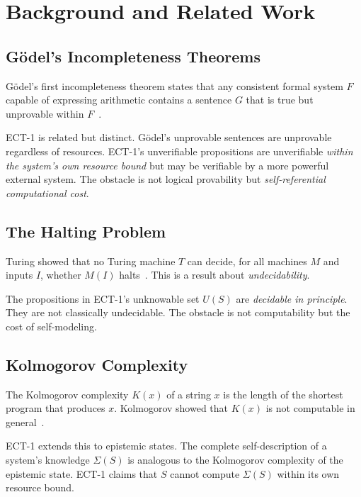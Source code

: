 \documentclass[12pt]{article}
\theoremstyle{definition}
\newcommand{\SM}{\Sigma(S)}
\newcommand{\US}{U(S)}
\begin{document}
\section{Background and Related Work}
\label{sec:background}

\subsection{G\"{o}del's Incompleteness Theorems}

G\"{o}del's first incompleteness theorem states that any consistent formal system $F$ capable of expressing arithmetic contains a sentence $G$ that is true but unprovable within $F$~\cite{godel1931}.

ECT-1 is related but distinct. G\"{o}del's unprovable sentences are unprovable regardless of resources. ECT-1's unverifiable propositions are unverifiable \emph{within the system's own resource bound} but may be verifiable by a more powerful external system. The obstacle is not logical provability but \emph{self-referential computational cost}.

\subsection{The Halting Problem}

Turing showed that no Turing machine $T$ can decide, for all machines $M$ and inputs $I$, whether $M(I)$ halts~\cite{turing1936}. This is a result about \emph{undecidability}.

The propositions in ECT-1's unknowable set $\US$ are \emph{decidable in principle}. They are not classically undecidable. The obstacle is not computability but the cost of self-modeling.

\subsection{Kolmogorov Complexity}

The Kolmogorov complexity $K(x)$ of a string $x$ is the length of the shortest program that produces $x$. Kolmogorov showed that $K(x)$ is not computable in general~\cite{kolmogorov1965}.

ECT-1 extends this to epistemic states. The complete self-description of a system's knowledge $\SM$ is analogous to the Kolmogorov complexity of the epistemic state. ECT-1 claims that $S$ cannot compute $\SM$ within its own resource bound.
\end{document}

